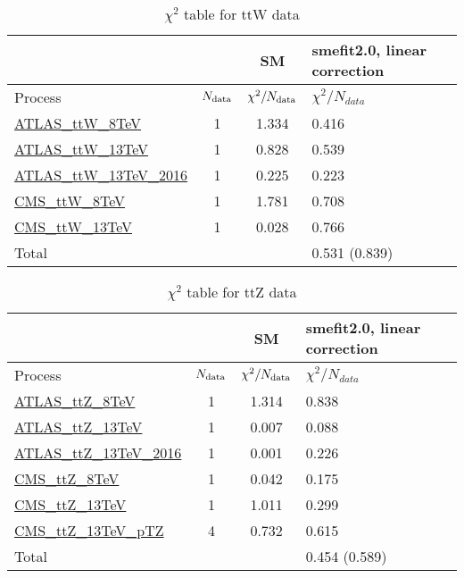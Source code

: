 \documentclass{article}
\begin{document}
\begin{table}[H]
\centering
\begin{tabular}{|l|c|c|C{3cm}|}
\hline
  & SM& smefit2.0, linear correction\\ \hline
Process & $N_{\rm data}$ & $\chi^ 2/N_{\rm data}$& $\chi^ 2/N_{data}$\\ \hline
\href{https://arxiv.org/abs/1509.05276}{ATLAS_ttW_8TeV} & 1 & 1.334 & {\color{blue} 0.416} \\ \hline
\href{https://arxiv.org/abs/1609.01599}{ATLAS_ttW_13TeV} & 1 & 0.828 & {\color{blue} 0.539} \\ \hline
\href{https://arxiv.org/abs/1901.03584}{ATLAS_ttW_13TeV_2016} & 1 & 0.225 & {\color{black} 0.223} \\ \hline
\href{https://arxiv.org/abs/1510.01131}{CMS_ttW_8TeV} & 1 & 1.781 & {\color{blue} 0.708} \\ \hline
\href{https://arxiv.org/abs/1711.02547}{CMS_ttW_13TeV} & 1 & 0.028 & {\color{black} 0.766} \\ \hline
\hline Total & &  & 0.531 (0.839) \\ \hline
\end{tabular}
\caption{$\chi^2$ table for ttW data}
\end{table}
\begin{table}[H]
\centering
\begin{tabular}{|l|c|c|C{3cm}|}
\hline
  & SM& smefit2.0, linear correction\\ \hline
Process & $N_{\rm data}$ & $\chi^ 2/N_{\rm data}$& $\chi^ 2/N_{data}$\\ \hline
\href{https://arxiv.org/abs/1509.05276}{ATLAS_ttZ_8TeV} & 1 & 1.314 & {\color{black} 0.838} \\ \hline
\href{https://arxiv.org/abs/1609.01599}{ATLAS_ttZ_13TeV} & 1 & 0.007 & {\color{black} 0.088} \\ \hline
\href{https://arxiv.org/abs/1901.03584}{ATLAS_ttZ_13TeV_2016} & 1 & 0.001 & {\color{black} 0.226} \\ \hline
\href{https://arxiv.org/abs/1510.01131}{CMS_ttZ_8TeV} & 1 & 0.042 & {\color{black} 0.175} \\ \hline
\href{https://arxiv.org/abs/1711.02547}{CMS_ttZ_13TeV} & 1 & 1.011 & {\color{blue} 0.299} \\ \hline
\href{https://arxiv.org/abs/1907.11270}{CMS_ttZ_13TeV_pTZ} & 4 & 0.732 & {\color{black} 0.615} \\ \hline
\hline Total & &  & 0.454 (0.589) \\ \hline
\end{tabular}
\caption{$\chi^2$ table for ttZ data}
\end{table}
\end{document}
